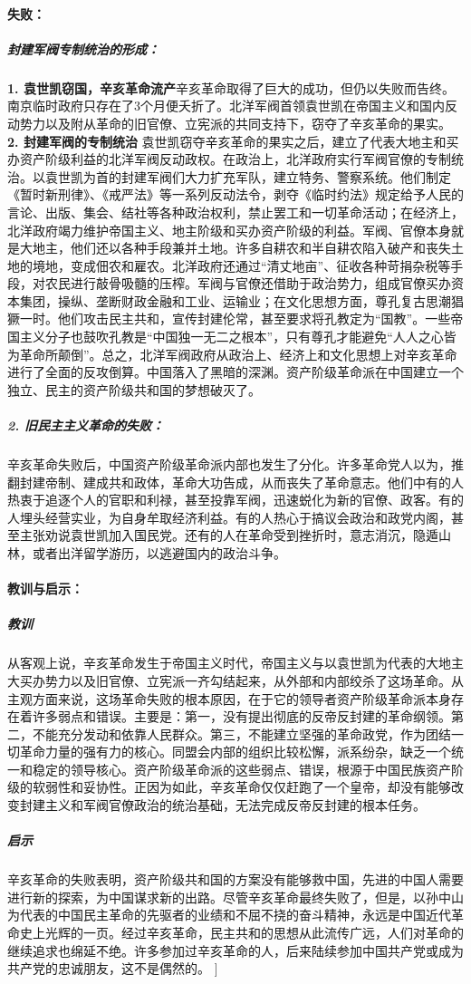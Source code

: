 \begin{enumerate}
		\paragraph{失败：}
			\subparagraph{封建军阀专制统治的形成：}
				\textbf{1. 袁世凯窃国，辛亥革命流产}辛亥革命取得了巨大的成功，但仍以失败而告终。南京临时政府只存在了3个月便夭折了。北洋军阀首领袁世凯在帝国主义和国内反动势力以及附从革命的旧官僚、立宪派的共同支持下，窃夺了辛亥革命的果实。
				\textbf{2. 封建军阀的专制统治} 袁世凯窃夺辛亥革命的果实之后，建立了代表大地主和买办资产阶级利益的北洋军阀反动政权。在政治上，北洋政府实行军阀官僚的专制统治。以袁世凯为首的封建军阀们大力扩充军队，建立特务、警察系统。他们制定《暂时新刑律》、《戒严法》等一系列反动法令，剥夺《临时约法》规定给予人民的言论、出版、集会、结社等各种政治权利，禁止罢工和一切革命活动；在经济上，北洋政府竭力维护帝国主义、地主阶级和买办资产阶级的利益。军阀、官僚本身就是大地主，他们还以各种手段兼并土地。许多自耕农和半自耕农陷入破产和丧失土地的境地，变成佃农和雇农。北洋政府还通过“清丈地亩”、征收各种苛捐杂税等手段，对农民进行敲骨吸髓的压榨。军阀与官僚还借助于政治势力，组成官僚买办资本集团，操纵、垄断财政金融和工业、运输业；在文化思想方面，尊孔复古思潮猖獗一时。他们攻击民主共和，宣传封建伦常，甚至要求将孔教定为“国教”。一些帝国主义分子也鼓吹孔教是“中国独一无二之根本”，只有尊孔才能避免“人人之心皆为革命所颠倒”。总之，北洋军阀政府从政治上、经济上和文化思想上对辛亥革命进行了全面的反攻倒算。中国落入了黑暗的深渊。资产阶级革命派在中国建立一个独立、民主的资产阶级共和国的梦想破灭了。
			\subparagraph{2. 旧民主主义革命的失败：}
			辛亥革命失败后，中国资产阶级革命派内部也发生了分化。许多革命党人以为，推翻封建帝制、建成共和政体，革命大功告成，从而丧失了革命意志。他们中有的人热衷于追逐个人的官职和利禄，甚至投靠军阀，迅速蜕化为新的官僚、政客。有的人埋头经营实业，为自身牟取经济利益。有的人热心于搞议会政治和政党内阁，甚至主张劝说袁世凯加入国民党。还有的人在革命受到挫折时，意志消沉，隐遁山林，或者出洋留学游历，以逃避国内的政治斗争。
		\paragraph{教训与启示：} 
			\subparagraph{教训} 从客观上说，辛亥革命发生于帝国主义时代，帝国主义与以袁世凯为代表的大地主大买办势力以及旧官僚、立宪派一齐勾结起来，从外部和内部绞杀了这场革命。从主观方面来说，这场革命失败的根本原因，在于它的领导者资产阶级革命派本身存在着许多弱点和错误。主要是：第一，没有提出彻底的反帝反封建的革命纲领。第二，不能充分发动和依靠人民群众。第三，不能建立坚强的革命政党，作为团结一切革命力量的强有力的核心。同盟会内部的组织比较松懈，派系纷杂，缺乏一个统一和稳定的领导核心。资产阶级革命派的这些弱点、错误，根源于中国民族资产阶级的软弱性和妥协性。正因为如此，辛亥革命仅仅赶跑了一个皇帝，却没有能够改变封建主义和军阀官僚政治的统治基础，无法完成反帝反封建的根本任务。
			\subparagraph{启示} 辛亥革命的失败表明，资产阶级共和国的方案没有能够救中国，先进的中国人需要进行新的探索，为中国谋求新的出路。尽管辛亥革命最终失败了，但是，以孙中山为代表的中国民主革命的先驱者的业绩和不屈不挠的奋斗精神，永远是中国近代革命史上光辉的一页。经过辛亥革命，民主共和的思想从此流传广远，人们对革命的继续追求也绵延不绝。许多参加过辛亥革命的人，后来陆续参加中国共产党或成为共产党的忠诚朋友，这不是偶然的。
	]
\end{enumerate}

